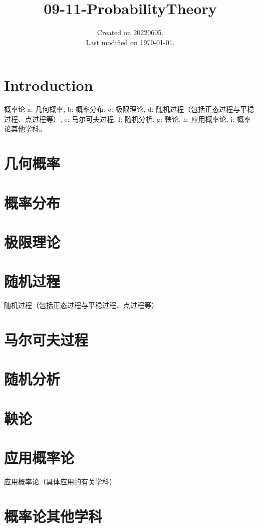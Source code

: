 \documentclass[UTF8]{../09-Mathematics}
\begin{document}
\title{09-11-ProbabilityTheory}
\date{Created on 20220605.\\   Last modified on \today.}
\maketitle
\tableofcontents


\chapter{Introduction}

概率论
a: 几何概率, 
b: 概率分布, 
c: 极限理论, 
d: 随机过程（包括正态过程与平稳过程、点过程等）, 
e: 马尔可夫过程, 
f: 随机分析, 
g: 鞅论, 
h: 应用概率论, 
i: 概率论其他学科。

\chapter{几何概率}
\chapter{概率分布}
\chapter{极限理论}
\chapter{随机过程}
随机过程（包括正态过程与平稳过程、点过程等）
\chapter{马尔可夫过程}
\chapter{随机分析}
\chapter{鞅论}
\chapter{应用概率论}
应用概率论（具体应用的有关学科）
\chapter{概率论其他学科}
\end{document}
